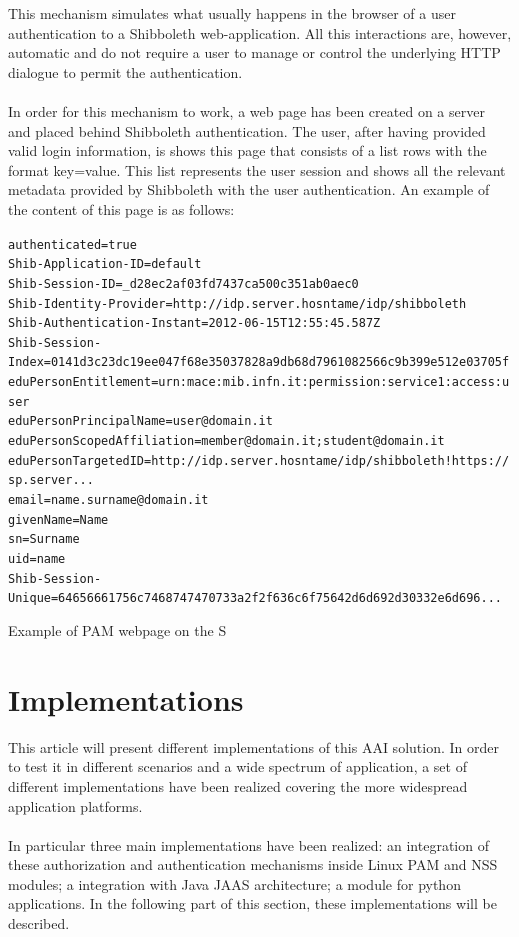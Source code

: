 This mechanism simulates what usually happens in the browser of a user authentication to a Shibboleth web-application.
All this interactions are, however, automatic and do not require a user to manage or control the underlying HTTP dialogue to permit the
authentication.\\
\\
In order for this mechanism to work, a web page has been created on a server and placed behind Shibboleth authentication.
The user, after having provided valid login information, is shows this page that consists of a list rows with the format key=value.
This list represents the user session and shows all the relevant metadata provided by Shibboleth with the user authentication.
An example of the content of this page is as follows:
\begin{algorithm}[t]
\SetAlgoNoLine
\texttt{authenticated=true}\\
\texttt{Shib-Application-ID=default}\\
\texttt{Shib-Session-ID=\_d28ec2af03fd7437ca500c351ab0aec0}\\
\texttt{Shib-Identity-Provider=http://idp.server.hosntame/idp/shibboleth}\\
\texttt{Shib-Authentication-Instant=2012-06-15T12:55:45.587Z}\\
\texttt{Shib-Session-Index=0141d3c23dc19ee047f68e35037828a9db68d7961082566c9b399e512e03705f}\\
\texttt{eduPersonEntitlement=urn:mace:mib.infn.it:permission:service1:access:user}\\
\texttt{eduPersonPrincipalName=user@domain.it}\\
\texttt{eduPersonScopedAffiliation=member@domain.it;student@domain.it}\\
\texttt{eduPersonTargetedID=http://idp.server.hosntame/idp/shibboleth!https://sp.server...}\\
\texttt{email=name.surname@domain.it}\\
\texttt{givenName=Name}\\
\texttt{sn=Surname}\\
\texttt{uid=name}\\
\texttt{Shib-Session-Unique=64656661756c7468747470733a2f2f636c6f75642d6d692d30332e6d696...}
\caption{Example of PAM webpage on the S}
\label{alg:examplepam}
\end{algorithm}

\label{sec:implementations}
\section{Implementations}
This article will present different implementations of this AAI solution.
In order to test it in different scenarios and a wide spectrum of application, a set of different implementations have been realized
covering the more widespread application platforms.\\
\\
In particular three main implementations have been realized: an integration of these authorization and authentication mechanisms inside
Linux PAM and NSS modules; a integration with Java JAAS architecture; a module for python applications.
In the following part of this section, these implementations will be described.

